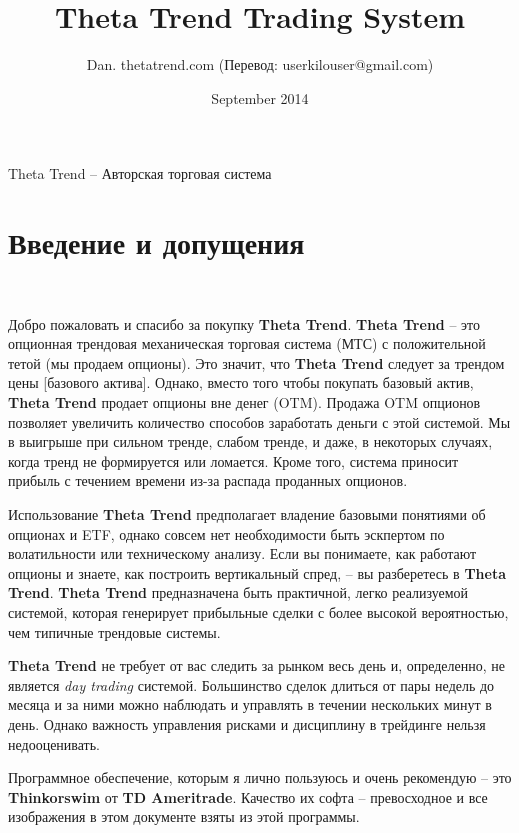 \documentclass[12pt,DIV=18]{scrartcl}
\title{Theta Trend Trading System}
\author{Dan. thetatrend.com (Перевод: userkilouser@gmail.com)}
\date{September 2014}
\begin{document}
\maketitle
Theta Trend -- Авторская торговая система


\tableofcontents

\clearpage

\section*{Введение и допущения}
\label{intro}
\textcolor{White}{.}

Добро пожаловать и спасибо за покупку \textbf{Theta Trend}. \textbf{Theta Trend} -- это опционная трендовая механическая торговая система (МТС) с положительной тетой (мы продаем опционы). Это значит, что \textbf{Theta Trend} следует за трендом цены [базового актива]. Однако, вместо того чтобы покупать базовый актив, \textbf{Theta Trend} продает опционы вне денег (OTM). Продажа OTM опционов позволяет увеличить количество способов заработать деньги с этой системой. Мы в выигрыше при сильном тренде, слабом тренде, и даже, в некоторых случаях, когда тренд не формируется или ломается. Кроме того, система приносит прибыль с течением времени из-за распада проданных опционов.

\bigskip

Использование \textbf{Theta Trend} предполагает владение базовыми понятиями об опционах и ETF, однако совсем нет необходимости быть эскпертом по волатильности или техническому анализу. Если вы понимаете, как работают опционы и знаете, как построить вертикальный спред, -- вы разберетесь в \textbf{Theta Trend}. \textbf{Theta Trend} предназначена быть практичной, легко реализуемой системой, которая генерирует прибыльные сделки с более высокой вероятностью, чем типичные трендовые системы.

\bigskip

\textbf{Theta Trend} не требует от вас следить за рынком весь день и, определенно, не является \textit{day trading} системой. Большинство сделок длиться от пары недель до месяца и за ними можно наблюдать и управлять в течении нескольких минут в день. Однако важность управления рисками и дисциплину в трейдинге нельзя недооценивать.

\bigskip

Программное обеспечение, которым я лично пользуюсь и очень рекомендую -- это \textbf{Thinkorswim} от \textbf{TD Ameritrade}. Качество их софта -- превосходное и все изображения в этом документе взяты из этой программы.
\end{document}
